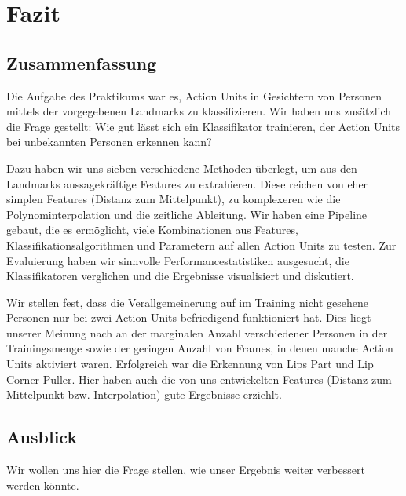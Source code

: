 \chapter{Fazit}\label{ch:fazit}
\section{Zusammenfassung}
Die Aufgabe des Praktikums war es, Action Units in Gesichtern von Personen mittels der vorgegebenen
Landmarks zu klassifizieren.
Wir haben uns zusätzlich die Frage gestellt: Wie gut lässt sich ein Klassifikator
trainieren, der Action Units bei unbekannten Personen erkennen kann?

Dazu haben wir uns sieben verschiedene Methoden überlegt, um aus den Landmarks
aussagekräftige Features zu extrahieren. Diese reichen von eher simplen Features (Distanz
zum Mittelpunkt), zu komplexeren wie die Polynominterpolation und die zeitliche
Ableitung. Wir haben eine Pipeline gebaut, die es ermöglicht, viele
Kombinationen aus Features, Klassifikationsalgorithmen und Parametern auf allen
Action Units zu testen.
Zur Evaluierung haben wir sinnvolle Performancestatistiken ausgesucht, die
Klassifikatoren verglichen und die Ergebnisse visualisiert und diskutiert.

Wir stellen fest, dass die Verallgemeinerung auf im Training nicht gesehene
Personen nur bei zwei Action Units befriedigend funktioniert hat. Dies liegt unserer Meinung nach an
der marginalen Anzahl verschiedener Personen in der Trainingsmenge sowie der
geringen Anzahl von Frames, in denen manche Action Units aktiviert waren.
Erfolgreich war die Erkennung von Lips Part und Lip Corner Puller. Hier haben
auch die von uns entwickelten Features (Distanz zum Mittelpunkt bzw.
Interpolation) gute Ergebnisse erziehlt.
\section{Ausblick}
Wir wollen uns hier die Frage stellen, wie unser Ergebnis weiter verbessert werden könnte.

